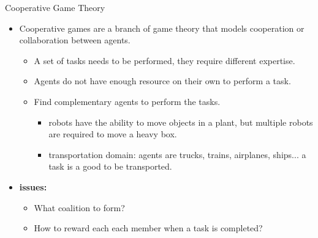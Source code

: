 \documentclass{beamer}
\begin{document}
    \begin{frame}{Cooperative Game Theory}
      \begin{itemize}
         \item Cooperative games are a branch of game theory that models cooperation or collaboration between agents.
         \begin{itemize}
            \item A set of tasks needs to be performed, they require different expertise.
            \item Agents do not have enough resource on their own to perform a task.
            \item Find complementary agents to perform the tasks.
            \begin{itemize}
                \item robots have the ability to move objects in a plant, but multiple robots are required to move a heavy box.
                \item transportation domain: agents are trucks, trains, airplanes, ships... a task is a good to be transported.
            \end{itemize}
        \end{itemize}
        \item \textbf{issues:}
            \begin{itemize}
                \item What coalition to form?
                \item How to reward each each member when a task is completed?
            \end{itemize}
      \end{itemize}
    \end{frame}
\end{document}

